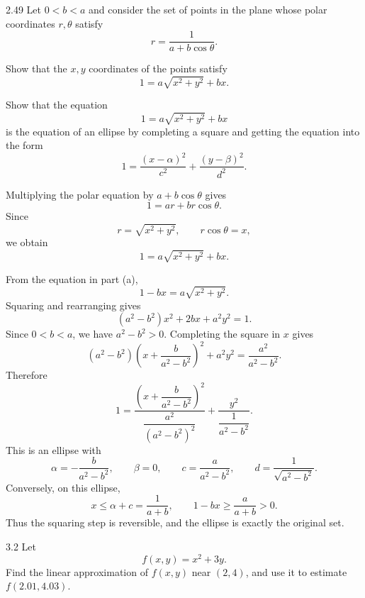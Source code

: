 \documentclass[11pt,oneside]{article}
\begin{document}
\begin{problem}{2.49}
Let $0<b<a$ and consider the set of points in the plane whose polar coordinates $r,\theta$ satisfy
\[
    r=\frac{1}{a+b\cos\theta}.
\]
\begin{problemsubparts}
    \item Show that the $x,y$ coordinates of the points satisfy
    \[
        1=a\sqrt{x^2+y^2}+bx.
    \]
    \item Show that the equation
    \[
        1=a\sqrt{x^2+y^2}+bx
    \]
    is the equation of an ellipse by completing a square and getting the equation into the form
    \[
        1=\frac{(x-\alpha)^2}{c^2}+\frac{(y-\beta)^2}{d^2}.
    \]
\end{problemsubparts}
\end{problem}

\begin{solution}
\begin{problemsubparts}
    \item Multiplying the polar equation by $a+b\cos\theta$ gives
    \[
        1=ar+br\cos\theta.
    \]
    Since
    \[
        r=\sqrt{x^2+y^2},
        \qquad
        r\cos\theta=x,
    \]
    we obtain
    \[
        \boxed{1=a\sqrt{x^2+y^2}+bx}.
    \]

    \item From the equation in part (a),
    \[
        1-bx=a\sqrt{x^2+y^2}.
    \]
    Squaring and rearranging gives
    \[
        (a^2-b^2)x^2+2bx+a^2y^2=1.
    \]
    Since $0<b<a$, we have $a^2-b^2>0$. Completing the square in $x$ gives
    \[
        (a^2-b^2)
        \left(x+\frac{b}{a^2-b^2}\right)^2
        +a^2y^2
        =\frac{a^2}{a^2-b^2}.
    \]
    Therefore
    \[
        \boxed{
        1=
        \frac{\left(x+\dfrac{b}{a^2-b^2}\right)^2}
             {\dfrac{a^2}{(a^2-b^2)^2}}
        +
        \frac{y^2}{\dfrac{1}{a^2-b^2}}
        }.
    \]
    This is an ellipse with
    \[
        \alpha=-\frac{b}{a^2-b^2},
        \qquad
        \beta=0,
        \qquad
        c=\frac{a}{a^2-b^2},
        \qquad
        d=\frac{1}{\sqrt{a^2-b^2}}.
    \]
    Conversely, on this ellipse,
    \[
        x\leq\alpha+c=\frac{1}{a+b},
        \qquad
        1-bx\geq\frac{a}{a+b}>0.
    \]
    Thus the squaring step is reversible, and the ellipse is exactly the original set.
\end{problemsubparts}
\end{solution}

\begin{problem}{3.2}
Let
\[
    f(x,y)=x^2+3y.
\]
Find the linear approximation of $f(x,y)$ near $(2,4)$, and use it to estimate $f(2.01,4.03)$.
\end{problem}
\end{document}

